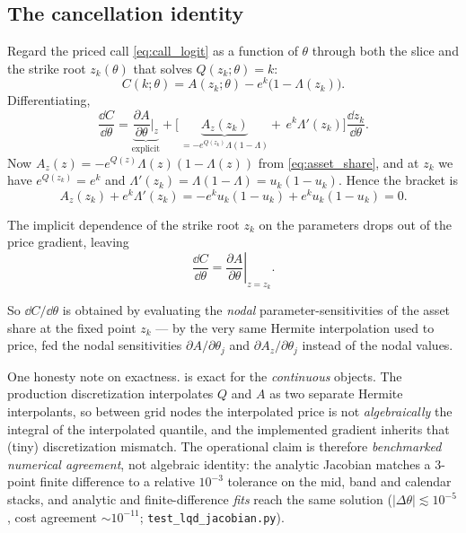 \documentclass[11pt]{article}
\begin{document}
\subsection{The cancellation identity}

Regard the priced call \eqref{eq:call_logit} as a function of $\theta$ through
both the slice and the strike root $z_k(\theta)$ that solves $Q(z_k;\theta)=k$:
\begin{equation}
C(k;\theta)=A(z_k;\theta)-e^{k}\big(1-\Lambda(z_k)\big).
\end{equation}
Differentiating,
\begin{equation}
\frac{\dd C}{\dd\theta}
=\underbrace{\frac{\partial A}{\partial\theta}\Big|_{z}}_{\text{explicit}}
+\Big[\,\underbrace{A_z(z_k)}_{=-e^{Q(z_k)}\Lambda(1-\Lambda)}
+\,e^{k}\Lambda'(z_k)\Big]\frac{\dd z_k}{\dd\theta}.
\end{equation}
Now $A_z(z)=-e^{Q(z)}\Lambda(z)(1-\Lambda(z))$ from \eqref{eq:asset_share}, and at
$z_k$ we have $e^{Q(z_k)}=e^{k}$ and $\Lambda'(z_k)=\Lambda(1-\Lambda)=u_k(1-u_k)$.
Hence the bracket is
\begin{equation}
A_z(z_k)+e^{k}\Lambda'(z_k)
=-e^{k}u_k(1-u_k)+e^{k}u_k(1-u_k)=0.
\end{equation}

\begin{theorem}
\label{thm:cancel}
The implicit dependence of the strike root $z_k$ on the parameters drops out of
the price gradient, leaving
\begin{equation}
\frac{\dd C}{\dd\theta}
=\left.\frac{\partial A}{\partial\theta}\right|_{z=z_k}.
\label{eq:dC}
\end{equation}
\end{theorem}

\noindent So $\dd C/\dd\theta$ is obtained by evaluating the \emph{nodal}
parameter-sensitivities of the asset share at the fixed point $z_k$ --- by the
very same Hermite interpolation used to price, fed the nodal sensitivities
$\partial A/\partial\theta_j$ and $\partial A_z/\partial\theta_j$ instead of the
nodal values.

One honesty note on exactness.  is exact for the
\emph{continuous} objects. The production discretization interpolates $Q$ and
$A$ as two separate Hermite interpolants, so between grid nodes the
interpolated price is not \emph{algebraically} the integral of the
interpolated quantile, and the implemented gradient inherits that (tiny)
discretization mismatch. The operational claim is therefore \emph{benchmarked
numerical agreement}, not algebraic identity: the analytic Jacobian matches a
3-point finite difference to a relative $10^{-3}$ tolerance on the mid, band
and calendar stacks, and analytic and finite-difference \emph{fits} reach the
same solution ($|\Delta\theta|\lesssim10^{-5}$, cost agreement
$\sim10^{-11}$; \texttt{test\_lqd\_jacobian.py}).
\end{document}
